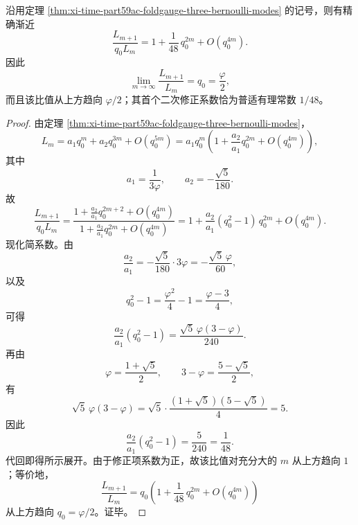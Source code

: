 \begin{theorem}\label{thm:xi-time-part59ac-foldgauge-ratio-one-forty-eighth}
沿用定理 \ref{thm:xi-time-part59ac-foldgauge-three-bernoulli-modes} 的记号，则有精确渐近
\[
\boxed{\;
\frac{L_{m+1}}{q_0L_m}
=
1+\frac{1}{48}\,q_0^{2m}+O(q_0^{4m}).\;}
\]
因此
\[
\lim_{m\to\infty}\frac{L_{m+1}}{L_m}=q_0=\frac{\varphi}{2},
\]
而且该比值从上方趋向 \(\varphi/2\)；其首个二次修正系数恰为普适有理常数 \(1/48\)。
\end{theorem}
\begin{proof}
由定理 \ref{thm:xi-time-part59ac-foldgauge-three-bernoulli-modes}，
\[
L_m
=
a_1q_0^m+a_2q_0^{3m}+O(q_0^{5m})
=
a_1q_0^m\left(1+\frac{a_2}{a_1}q_0^{2m}+O(q_0^{4m})\right),
\]
其中
\[
a_1=\frac{1}{3\varphi},
\qquad
a_2=-\frac{\sqrt5}{180}.
\]
故
\[
\frac{L_{m+1}}{q_0L_m}
=
\frac{1+\frac{a_2}{a_1}q_0^{2m+2}+O(q_0^{4m})}
{1+\frac{a_2}{a_1}q_0^{2m}+O(q_0^{4m})}
=
1+\frac{a_2}{a_1}(q_0^2-1)\,q_0^{2m}+O(q_0^{4m}).
\]
现化简系数。由
\[
\frac{a_2}{a_1}
=
-\frac{\sqrt5}{180}\cdot 3\varphi
=
-\frac{\sqrt5\,\varphi}{60},
\]
以及
\[
q_0^2-1=\frac{\varphi^2}{4}-1=\frac{\varphi-3}{4},
\]
可得
\[
\frac{a_2}{a_1}(q_0^2-1)
=
\frac{\sqrt5\,\varphi(3-\varphi)}{240}.
\]
再由
\[
\varphi=\frac{1+\sqrt5}{2},
\qquad
3-\varphi=\frac{5-\sqrt5}{2},
\]
有
\[
\sqrt5\,\varphi(3-\varphi)
=
\sqrt5\cdot\frac{(1+\sqrt5)(5-\sqrt5)}{4}
=
5.
\]
因此
\[
\frac{a_2}{a_1}(q_0^2-1)=\frac{5}{240}=\frac{1}{48}.
\]
代回即得所示展开。由于修正项系数为正，故该比值对充分大的 \(m\) 从上方趋向 \(1\)；等价地，
\[
\frac{L_{m+1}}{L_m}
=
q_0\left(1+\frac{1}{48}\,q_0^{2m}+O(q_0^{4m})\right)
\]
从上方趋向 \(q_0=\varphi/2\)。证毕。
\end{proof}

\endinput

